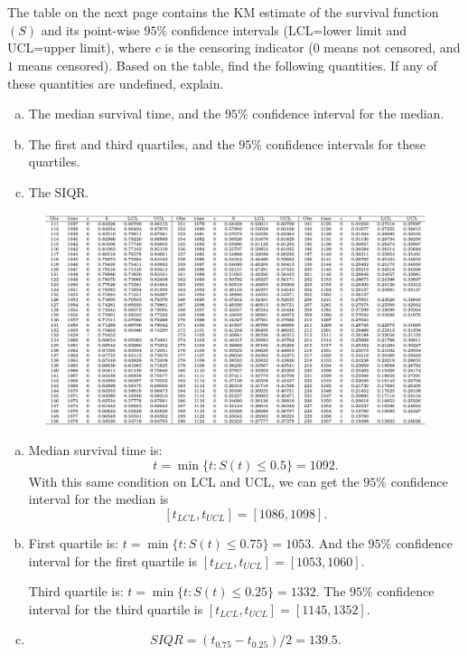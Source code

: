 \documentclass[12pt]{elegantbook}
\begin{document}

\setcounter{chapter}{2}
\chapter{}

    
    \begin{exercise*}[1]
        The table on the next page contains the KM estimate of the survival function $(S)$ and its point-wise $95\%$ confidence intervals (LCL=lower limit and UCL=upper limit), where $c$ is the censoring indicator ($0$ means not censored, and $1$ means censored). Based on the table, find the following quantities. If any of these quantities are undefined, explain. 
        \begin{enumerate}[(a)]
            \item The median survival time, and the $95\%$ confidence interval for the median.
            \item The first and third quartiles, and the $95\%$ confidence intervals for these quartiles.
            \item The SIQR. 
        \end{enumerate}
        \begin{figure}[H]
            \centering
            \includegraphics[width=\textwidth]{HW1_4.png}
        \end{figure}
    \end{exercise*}
    \begin{solution}
        \begin{enumerate}[(a)]
            \item Median survival time is: 
            \[t=\min\{t:S(t)\leq0.5\}=1092. \] 
            With this same condition on LCL and UCL, we can get the $95\%$ confidence interval for the median is \[[t_{LCL},t_{UCL}]=[1086,1098]. \]
            \item First quartile is: $t=\min\{t:S(t)\leq0.75\}=1053$. And the $95\%$ confidence interval for the first quartile is $[t_{LCL},t_{UCL}]=[1053,1060]$. 
            
            Third quartile is: $t=\min\{t:S(t)\leq0.25\}=1332$. The $95\%$ confidence interval for the third quartile is $[t_{LCL},t_{UCL}]=[1145,1352]$. 
            \item \[SIQR=(t_{0.75}-t_{0.25})/2=139.5. \]
        \end{enumerate}
    \end{solution}
\end{document}
